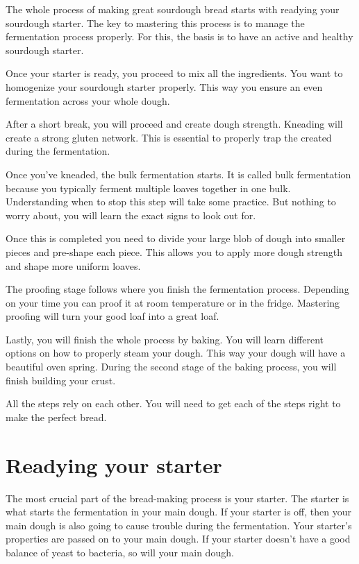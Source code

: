 The whole process of making great sourdough bread starts with
readying your sourdough starter. The key to mastering
this process is to manage the fermentation process properly.
For this, the basis is to have an active and healthy
sourdough starter.

Once your starter is ready, you proceed to mix all the ingredients.
You want to homogenize your sourdough starter properly. This
way you ensure an even fermentation across your whole dough.

After a short break, you will proceed and create dough strength.
Kneading will create a strong gluten network. This is essential
to properly trap the  created during the fermentation.

Once you've kneaded, the bulk fermentation starts. It is called bulk fermentation
because you typically ferment multiple loaves together in one bulk.
Understanding when to stop this step will take some practice.
But nothing to worry about, you will learn the exact signs to look out for.

Once this is completed you need to divide your large blob of
dough into smaller pieces and pre-shape each piece. This allows
you to apply more dough strength and shape more uniform loaves.

The proofing stage follows where you finish the fermentation process.
Depending on your time you can proof it at room temperature or in the fridge.
Mastering proofing will turn your good loaf into a great loaf.

Lastly, you will finish the whole process by baking. You will learn different
options on how to properly steam your dough. This way your
dough will have a beautiful oven spring. During the second
stage of the baking process, you will finish building your crust.

All the steps rely on each other. You will need to get each of
the steps right to make the perfect bread.

\section{Readying your starter}%
\label{section:readying-starter}

The most crucial part of the bread-making process is your starter.
The starter is what starts the fermentation in your main dough.
If your starter is off, then your main dough is also going
to cause trouble during the fermentation. Your starter's
properties are passed on to your main dough. If your starter
doesn't have a good balance of yeast to bacteria, so will your
main dough.

